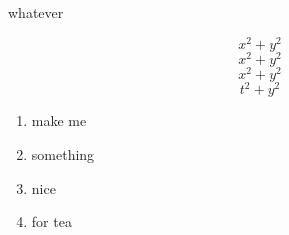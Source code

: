 \documentclass{article}
\begin{document}
\begin{center}
	\Large{whatever}
\end{center}

\vspace{.5in}
$$x^2 + y^2$$
$$x^2 + y^2$$
$$x^2 + y^2$$
$$t^2 + y^2$$

\vspace{.5in}

\begin{enumerate}
\item make me
\item something
\item nice
\item for tea
\end{enumerate}
\end{document}
